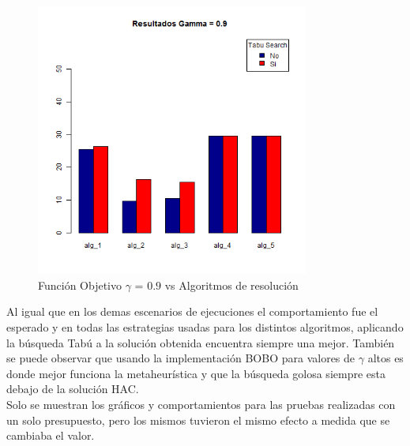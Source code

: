 \begin{figure}[H]
  \centering
    \includegraphics[width=0.8\textwidth]{resultados/cities/Graficos_agrupados/gamma09-cities.png}
  \caption{Función Objetivo $\gamma$ = $0.9$ vs Algoritmos de resolución}
  \label{res:img-cities-agr-gamma09}
\end{figure}

Al igual que en los demas escenarios de ejecuciones el comportamiento fue el esperado y en todas las estrategias usadas para los distintos algoritmos, aplicando la búsqueda Tabú a la solución obtenida encuentra siempre una mejor. También se puede observar que usando la implementación BOBO para valores de $\gamma$ altos es donde mejor funciona la metaheurística y que la búsqueda golosa siempre esta debajo de la solución HAC.\\
Solo se muestran los gráficos y comportamientos para las pruebas realizadas con un solo presupuesto, pero los mismos tuvieron el mismo efecto a medida que se cambiaba el valor.
